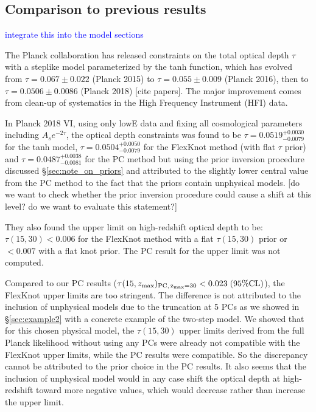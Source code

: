 \documentclass[prd,twocolumn,amsmath,amssymb,floatfix,superscriptaddress,nofootinbib]{revtex4-1}
\newcommand{\zmax}{z_{\rm max}}
\newcommand{\wh}[1]{\textcolor{blue}{#1}}
\begin{document}
{

\appendix



\subsection{Comparison to previous results}
\wh{integrate this into the model sections}

The Planck collaboration has released constraints on the total optical depth $\tau$ with a steplike model parameterized by the tanh function, which has evolved from $\tau = 0.067 \pm 0.022$ (Planck 2015) to $\tau = 0.055 \pm 0.009$ (Planck 2016), then to $\tau = 0.0506 \pm 0.0086$ (Planck 2018) [cite papers]. The major improvement comes from clean-up of systematics in the High Frequency Instrument (HFI) data. 

In Planck 2018 VI, using only lowE data and fixing all cosmological parameters including $A_s e^{-2\tau}$, the optical depth constraints was found to be $\tau = 0.0519^{+0.0030}_{-0.0079}$ for the tanh model, 
$\tau = 0.0504^{+0.0050}_{-0.0079}$ 
for the FlexKnot method (with flat $\tau$ prior) and 
$\tau = 0.0487^{+0.0038}_{-0.0081}$
for the PC method but using the prior inversion procedure
discussed \S\ref{sec:note_on_priors} and attributed to the slightly lower central value from the PC method to the fact that the priors contain unphysical models. [do we want to check whether the prior inversion procedure could cause a shift at this level? do we want to evaluate this statement?]

They also found the upper limit on high-redshift optical depth to be: $\tau(15, 30) < 0.006$ for the FlexKnot method with a flat $\tau(15, 30)$ prior or $<0.007$ with a flat knot prior. The PC result for the upper limit was not computed. 

Compared to our PC results ($\tau(15, \zmax)_{\rm PC,\, \zmax=30} < 0.023 \; (95\% \mathrm{CL})$), the FlexKnot upper limits are too stringent. The difference is not attributed to the inclusion of unphysical models due to the truncation at 5 PCs as we showed in \S\ref{sec:example2} with a concrete example of the two-step model. We showed that for this chosen physical model, the $\tau(15, 30)$ upper limits derived from the full Planck likelihood without using any PCs were already not compatible with the FlexKnot upper limits, while the PC results were compatible. So the discrepancy cannot be attributed to the prior choice in the PC results. It also seems that the inclusion of unphysical model would in any case shift the optical depth at high-redshift toward more negative values, which would decrease rather than increase the upper limit. 

}
\end{document}
